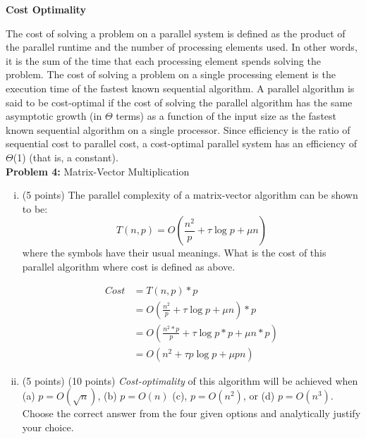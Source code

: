 \documentclass{article}
\begin{document}
    \textbf{Cost Optimality}
    
    The cost of solving a problem on a parallel system is defined as the product of the parallel runtime and
    the number of processing elements used. In other words, it is the sum of the time that each processing
    element spends solving the problem. The cost of solving a problem on a single processing element is the
    execution time of the fastest known sequential algorithm. A parallel algorithm is said to be cost-optimal
    if the cost of solving the parallel algorithm has the same asymptotic growth (in $\Theta$ terms) as a function of
    the input size as the fastest known sequential algorithm on a single processor. Since efficiency is the ratio
    of sequential cost to parallel cost, a cost-optimal parallel system has an efficiency of $\Theta$(1) (that is, a constant). \\


    \textbf{Problem 4:} Matrix-Vector Multiplication
    \begin{enumerate}[i.]
    \item (5 points) The parallel complexity of a matrix-vector algorithm can be shown to be:    
    \begin{equation}
        T(n,p) = O(\frac{n^2}{p} + \tau\log{p}+\mu{n})
    \end{equation}    
    where the symbols have their usual meanings. What is the cost of this parallel algorithm where cost is
defined as above.

    \begin{align*}
        Cost &= T(n,p) * p\\
        &= O(\frac{n^2}{p} + \tau\log{p}+\mu{n})*p\\
        &= O(\frac{n^2*p}{p} + \tau\log{p}*p+\mu{n}*p)\\
        &= O(n^2 + \tau{p}\log{p} + \mu{p}n)
    \end{align*}

    \item (5 points) (10 points) \textit{Cost-optimality} of this algorithm will be achieved when (a) $p = O(\sqrt{n})$, (b) $p = O(n)$ (c),
    $p = O(n^2)$, or (d) $p = O(n^3)$. Choose the correct answer from the four given options and analytically
    justify your choice.
    \end{enumerate}
\end{document}
